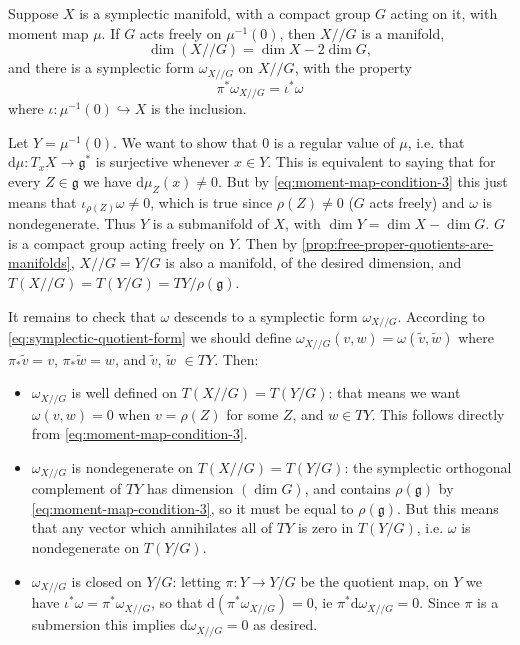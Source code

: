 \documentclass[12pt,letterpaper,reqno]{article}
\numberwithin{equation}{section}
\newcommand{\fg}{{\mathfrak g}}
\newcommand{\kq}{/\!\!/}
\newcommand{\de}{\mathrm{d}}
\begin{document}
\begin{prop} \label{prop:symplectic-quotient-is-symplectic}
Suppose $X$ is a symplectic manifold, with a compact group $G$
acting on it, with moment map $\mu$.
If $G$ acts freely
on $\mu^{-1}(0)$, then $X \kq G$ is a manifold,
\begin{equation}
  \dim (X \kq G) = \dim X - 2 \dim G,
\end{equation}
and there is a symplectic form $\omega_{X \kq G}$
on $X \kq G$,
with the property
\begin{equation} \label{eq:symplectic-quotient-form}
  \pi^* \omega_{X \kq G} = \iota^* \omega
\end{equation}
where $\iota: \mu^{-1}(0) \hookrightarrow X$ is the inclusion.
\end{prop}
\begin{pf}
Let $Y = \mu^{-1}(0)$.
We want to show that $0$ is a regular value of $\mu$,
i.e. that $\de \mu: T_x X \to \fg^*$ is surjective
whenever $x \in Y$. This
is equivalent to saying that for every $Z \in \fg$
we have $\de \mu_Z(x) \neq 0$.
But by \eqref{eq:moment-map-condition-3} this just means
that $\iota_{\rho(Z)} \omega \neq 0$,
which is true since $\rho(Z) \neq 0$ ($G$ acts freely)
and $\omega$ is nondegenerate.
Thus $Y$ is a submanifold of $X$,
with $\dim Y = \dim X - \dim G$.
$G$ is a compact group acting freely on $Y$.
Then by \autoref{prop:free-proper-quotients-are-manifolds},
$X \kq G = Y / G$ is also a manifold, of the desired
dimension, and $T(X \kq G) = T(Y/G) = TY / \rho(\fg)$.

It remains to check that $\omega$ descends to a
symplectic form $\omega_{X \kq G}$. According
to \eqref{eq:symplectic-quotient-form} we should define
$\omega_{X \kq G}(v,w) = \omega(\tilde v, \tilde w)$
where $\pi_* \tilde v = v$, $\pi_* \tilde w = w$,
and $\tilde v$, $\tilde w$ $\in TY$.
Then:
\begin{itemize}
\item $\omega_{X \kq G}$ is well defined
on $T(X \kq G) = T(Y/G)$: that means we want $\omega(v,w) = 0$
when $v = \rho(Z)$
for some $Z$, and $w \in TY$. This follows directly from
\eqref{eq:moment-map-condition-3}.
\item $\omega_{X \kq G}$ is nondegenerate on $T(X \kq G) = T(Y/G)$:
the symplectic orthogonal complement of $TY$ has dimension
$(\dim G)$, and contains $\rho(\fg)$ by
\eqref{eq:moment-map-condition-3}, so it must be equal
to $\rho(\fg)$. But this means that any vector which
annihilates all of $TY$ is zero in $T(Y/G)$, i.e.
$\omega$ is nondegenerate on $T(Y/G)$.
\item $\omega_{X \kq G}$ is closed on $Y/G$:
letting $\pi: Y \to Y/G$ be the quotient map,
on $Y$ we have $\iota^* \omega = \pi^* \omega_{X \kq G}$,
so that $\de (\pi^* \omega_{X \kq G}) = 0$,
ie $\pi^* \de \omega_{X \kq G} = 0$.
Since $\pi$ is a submersion this implies
$\de \omega_{X \kq G} = 0$ as desired.
\end{itemize}
\end{pf}
\end{document}
